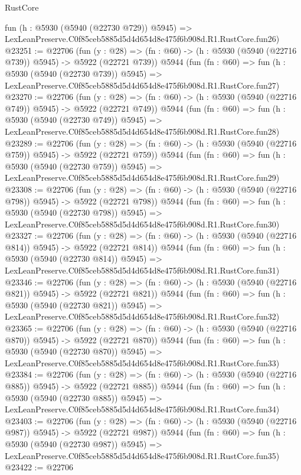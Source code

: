 \begin{lexlean}{RustCore}
\begin{coremodule}
    fun (h : @5930 (@5940 (@22730 @729)) @5945) =>
    LexLeanPreserve.C0f85ceb5885d5d4d654d8e475f6b908d.R1.RustCore.fun26)
@23251 := @22706
    (fun (y : @28) => (fn : @60) -> (h : @5930 (@5940 (@22716 @739)) @5945) -> @5922 (@22721 @739))
    @5944
    (fun (fn : @60) =>
    fun (h : @5930 (@5940 (@22730 @739)) @5945) =>
    LexLeanPreserve.C0f85ceb5885d5d4d654d8e475f6b908d.R1.RustCore.fun27)
@23270 := @22706
    (fun (y : @28) => (fn : @60) -> (h : @5930 (@5940 (@22716 @749)) @5945) -> @5922 (@22721 @749))
    @5944
    (fun (fn : @60) =>
    fun (h : @5930 (@5940 (@22730 @749)) @5945) =>
    LexLeanPreserve.C0f85ceb5885d5d4d654d8e475f6b908d.R1.RustCore.fun28)
@23289 := @22706
    (fun (y : @28) => (fn : @60) -> (h : @5930 (@5940 (@22716 @759)) @5945) -> @5922 (@22721 @759))
    @5944
    (fun (fn : @60) =>
    fun (h : @5930 (@5940 (@22730 @759)) @5945) =>
    LexLeanPreserve.C0f85ceb5885d5d4d654d8e475f6b908d.R1.RustCore.fun29)
@23308 := @22706
    (fun (y : @28) => (fn : @60) -> (h : @5930 (@5940 (@22716 @798)) @5945) -> @5922 (@22721 @798))
    @5944
    (fun (fn : @60) =>
    fun (h : @5930 (@5940 (@22730 @798)) @5945) =>
    LexLeanPreserve.C0f85ceb5885d5d4d654d8e475f6b908d.R1.RustCore.fun30)
@23327 := @22706
    (fun (y : @28) => (fn : @60) -> (h : @5930 (@5940 (@22716 @814)) @5945) -> @5922 (@22721 @814))
    @5944
    (fun (fn : @60) =>
    fun (h : @5930 (@5940 (@22730 @814)) @5945) =>
    LexLeanPreserve.C0f85ceb5885d5d4d654d8e475f6b908d.R1.RustCore.fun31)
@23346 := @22706
    (fun (y : @28) => (fn : @60) -> (h : @5930 (@5940 (@22716 @821)) @5945) -> @5922 (@22721 @821))
    @5944
    (fun (fn : @60) =>
    fun (h : @5930 (@5940 (@22730 @821)) @5945) =>
    LexLeanPreserve.C0f85ceb5885d5d4d654d8e475f6b908d.R1.RustCore.fun32)
@23365 := @22706
    (fun (y : @28) => (fn : @60) -> (h : @5930 (@5940 (@22716 @870)) @5945) -> @5922 (@22721 @870))
    @5944
    (fun (fn : @60) =>
    fun (h : @5930 (@5940 (@22730 @870)) @5945) =>
    LexLeanPreserve.C0f85ceb5885d5d4d654d8e475f6b908d.R1.RustCore.fun33)
@23384 := @22706
    (fun (y : @28) => (fn : @60) -> (h : @5930 (@5940 (@22716 @885)) @5945) -> @5922 (@22721 @885))
    @5944
    (fun (fn : @60) =>
    fun (h : @5930 (@5940 (@22730 @885)) @5945) =>
    LexLeanPreserve.C0f85ceb5885d5d4d654d8e475f6b908d.R1.RustCore.fun34)
@23403 := @22706
    (fun (y : @28) => (fn : @60) -> (h : @5930 (@5940 (@22716 @987)) @5945) -> @5922 (@22721 @987))
    @5944
    (fun (fn : @60) =>
    fun (h : @5930 (@5940 (@22730 @987)) @5945) =>
    LexLeanPreserve.C0f85ceb5885d5d4d654d8e475f6b908d.R1.RustCore.fun35)
@23422 := @22706

\end{coremodule}
\end{lexlean}
